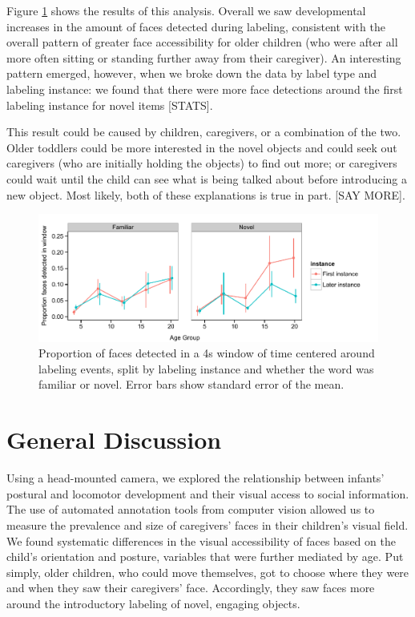 \documentclass[10pt,letterpaper]{article}
\begin{document}
Figure \ref{fig:naming_face} shows the results of this analysis. Overall we saw developmental increases in the amount of faces detected during labeling, consistent with the overall pattern of greater face accessibility for older children (who were after all more often sitting or standing further away from their caregiver). An interesting pattern emerged, however, when we broke down the data by label type and labeling instance: we found that there were more face detections around the first labeling instance for novel items [STATS].

This result could be caused by children, caregivers, or a combination of the two. Older toddlers could be more interested in the novel objects and could seek out caregivers (who are initially holding the objects) to find out more; or caregivers could wait until the child can see what is being talked about before introducing a new object. Most likely, both of these explanations is true in part. [SAY MORE].

\begin{figure}
\centering
\includegraphics[width=6in]{figures/naming_face.pdf}
\caption{\label{fig:naming_face} Proportion of faces detected in a 4s window of time centered around labeling events, split by labeling instance and whether the word was familiar or novel. Error bars show standard error of the mean.} 
\end{figure}


\section{General Discussion}

Using a head-mounted camera, we explored the relationship between infants' postural and locomotor development and their visual access to social information. The use of automated annotation tools from computer vision allowed us to measure the prevalence and size of caregivers' faces in their children's visual field. We found systematic differences in the visual accessibility of faces based on the child's orientation and posture, variables that were further mediated by age. Put simply, older children, who could move themselves, got to choose where they were and when they saw their caregivers' face. Accordingly, they saw faces more around the introductory labeling of novel, engaging objects. 
\end{document}
